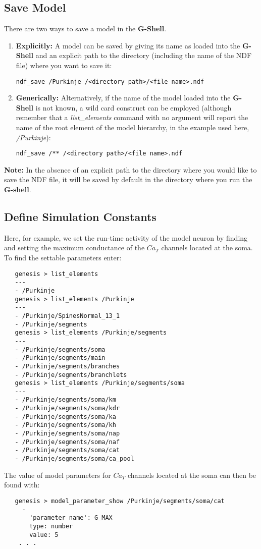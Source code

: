 \documentclass[12pt]{article}
\begin{document}
\subsection*{Save Model}

There are two ways to save a model in the {\bf G-Shell}.

\begin{enumerate}
   \item{\bf Explicitly:} A model can be saved by giving its name as loaded into the {\bf G-Shell} and an explicit path to the directory (including the name of the NDF file) where you want to save it:
   \begin{verbatim}
ndf_save /Purkinje /<directory path>/<file name>.ndf
   \end{verbatim}
   \item{\bf Generically:} Alternatively, if the name of the model loaded into the {\bf G-Shell} is not known, a wild card construct can be employed (although remember that a {\it list\_elements} command with no argument will report the name of the root element of the model hierarchy, in the example used here, {\it /Purkinje}):
   \begin{verbatim}
ndf_save /** /<directory path>/<file name>.ndf
   \end{verbatim}   
\end{enumerate}
{\bf Note:} In the absence of an explicit path to the directory where you would like to save the NDF file, it will be saved by default in the directory where you run the {\bf G-shell}.

\subsection*{Define Simulation Constants}

Here, for example, we set the run-time activity of the model neuron by finding and
setting the maximum conductance of the $Ca_T$ channels located at the soma. To find the settable parameters enter:
\begin{verbatim}
   genesis > list_elements
   ---
   - /Purkinje
   genesis > list_elements /Purkinje
   ---
   - /Purkinje/SpinesNormal_13_1
   - /Purkinje/segments
   genesis > list_elements /Purkinje/segments
   ---
   - /Purkinje/segments/soma
   - /Purkinje/segments/main
   - /Purkinje/segments/branches
   - /Purkinje/segments/branchlets
   genesis > list_elements /Purkinje/segments/soma
   ---
   - /Purkinje/segments/soma/km
   - /Purkinje/segments/soma/kdr
   - /Purkinje/segments/soma/ka
   - /Purkinje/segments/soma/kh
   - /Purkinje/segments/soma/nap
   - /Purkinje/segments/soma/naf
   - /Purkinje/segments/soma/cat
   - /Purkinje/segments/soma/ca_pool
\end{verbatim}
The value of model parameters for $Ca_T$ channels located at the soma can then be found with:
\begin{verbatim}
   genesis > model_parameter_show /Purkinje/segments/soma/cat
     -
       'parameter name': G_MAX
       type: number
       value: 5
    . . .  
\end{verbatim}
\end{document}

